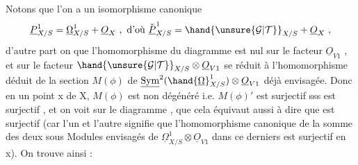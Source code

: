 Notons que l'on a un isomorphisme canonique
\[ \underline{P}^1_{X/S} = \underline{\Omega}^1_{X/S} + \underline{O}_X \ ,\ \text{d'où}\ \check{\underline{P}}^1_{X/S} = \hand{\unsure{\mathcal{G}|\mathcal{T}}}_{X/S} + \underline{O}_X \ , \]
d'autre part on  que l'homomorphisme  \hand{$\mu$} du diagramme  est nul
sur le facteur $\underline{O}_{V1}$ , et sur le facteur $\hand{\unsure{\mathcal{G}|\mathcal{T}}}_{X/S}\otimes\underline{O}_{V1}$  se réduit à
l'homomorphisme  déduit de la section $M(\phi)$ de $\underline{\mathrm{Sym}}^2(\hand{\underline{\Omega}}^1_{X/S})\otimes \underline{O}_{V1}$ déjà
envisagée. Donc en un point x de X, $M(\phi)$ est non dégénéré i.e. $M(\phi)'$
est surjectif sss \hand{$\mu$} est surjectif , et on voit sur le diagramme ,
que cela équivaut aussi à dire que \unsure{\hand{$\nu$}} est surjectif  (car l'un et l'autre
signifie que l'homomorphisme canonique de la somme des deux sous
Modules envisagés de $\underline{\Omega}^1_{X/S}\otimes \underline{O}_{V1}$ dans ce derniers est surjectif en
x). On trouve ainsi :

